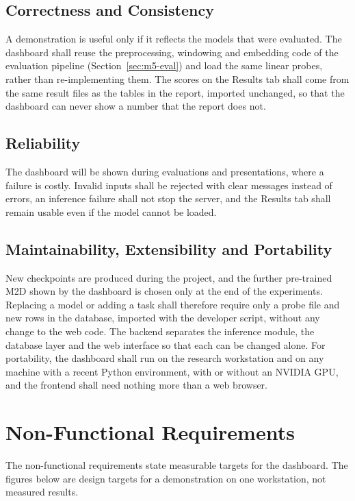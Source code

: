 \documentclass{FastFyp}
\begin{document}
\subsection{Correctness and Consistency}
A demonstration is useful only if it reflects the models that were evaluated. The dashboard shall reuse the preprocessing, windowing and embedding code of the evaluation pipeline (Section~\ref{sec:m5-eval}) and load the same linear probes, rather than re-implementing them. The scores on the Results tab shall come from the same result files as the tables in the report, imported unchanged, so that the dashboard can never show a number that the report does not.

\subsection{Reliability}
The dashboard will be shown during evaluations and presentations, where a failure is costly. Invalid inputs shall be rejected with clear messages instead of errors, an inference failure shall not stop the server, and the Results tab shall remain usable even if the model cannot be loaded.

\subsection{Maintainability, Extensibility and Portability}
New checkpoints are produced during the project, and the further pre-trained M2D shown by the dashboard is chosen only at the end of the experiments. Replacing a model or adding a task shall therefore require only a probe file and new rows in the database, imported with the developer script, without any change to the web code. The backend separates the inference module, the database layer and the web interface so that each can be changed alone. For portability, the dashboard shall run on the research workstation and on any machine with a recent Python environment, with or without an NVIDIA GPU, and the frontend shall need nothing more than a web browser.

\section{Non-Functional Requirements}
\label{sec:srs-nfr}
The non-functional requirements state measurable targets for the dashboard. The figures below are design targets for a demonstration on one workstation, not measured results.
\end{document}
